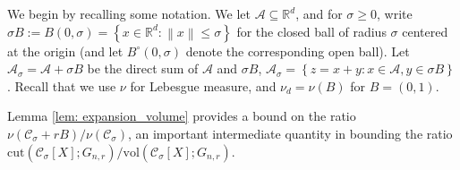 \documentclass[11pt,twoside]{article}
\theoremstyle{definition}
\newcommand{\set}[1]{\left\{#1\right\}}
\newcommand{\vol}{\mathrm{vol}}
\newcommand{\cut}{\mathrm{cut}}
\newcommand{\Reals}{\mathbb{R}}
\newcommand{\Rd}{\Reals^d}
\newcommand{\norm}[1]{\left\lVert#1\right\rVert}
\newcommand{\1}{\mathbbm{1}}
\newcommand{\Xbf}{X}
\newcommand{\Cset}{\mathcal{C}}
\newcommand{\Aset}{\mathcal{A}}
\newcommand{\Asig}{\Aset_{\sigma}}
\newcommand{\Csig}{\Cset_{\sigma}}
\begin{document}


We begin by recalling some notation. We let $\Aset \subseteq \Reals^d$, and for $\sigma \geq 0$, write $\sigma B := B(0,\sigma) = \set{x \in \Rd: \norm{x} \leq \sigma}$ for the closed ball of radius $\sigma$ centered at the origin (and let $B^{\circ}(0,\sigma)$ denote the corresponding open ball). Let $\Asig = \Aset + \sigma B$ be the direct sum of $\Aset$ and $\sigma B$, $\Asig = \set{z = x + y: x \in \Aset, y \in \sigma B}$. Recall that we use $\nu$ for Lebesgue measure, and $\nu_d = \nu(B)$ for $B = (0,1)$. 

Lemma \ref{lem: expansion_volume} provides a bound on the ratio $\nu(\Csig + r B) / \nu(\Csig)$, an important intermediate quantity in bounding the ratio $\cut(\Csig[\Xbf]; G_{n,r})/\vol(\Csig[\Xbf]; G_{n,r})$. 
\end{document}
